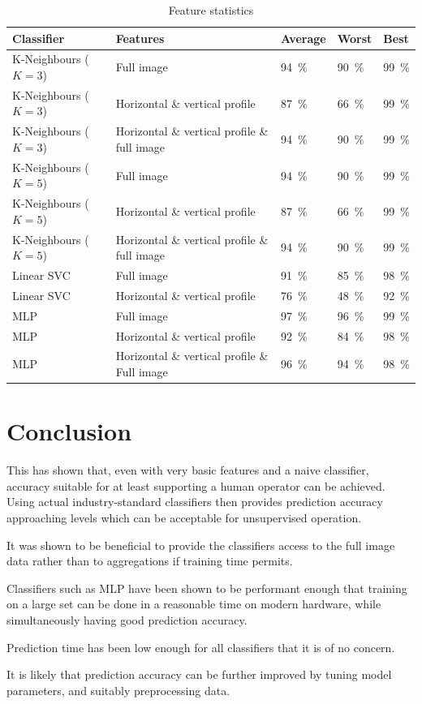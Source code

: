 \documentclass[a4paper]{scrreprt}
\begin{document}
\begin{table}
		\begin{tabular}{lllll}
				\toprule
				Classifier & Features & Average & Worst & Best \\
				\midrule
				K-Neighbours ($K = 3$) & Full image & \SI{94}{\percent} & \SI{90}{\percent} & \SI{99}{\percent} \\
				K-Neighbours ($K = 3$) & Horizontal \& vertical profile & \SI{87}{\percent} & \SI{66}{\percent} & \SI{99}{\percent} \\
				K-Neighbours ($K = 3$) & Horizontal \& vertical profile \& full image & \SI{94}{\percent} & \SI{90}{\percent} & \SI{99}{\percent} \\
				K-Neighbours ($K = 5$) & Full image & \SI{94}{\percent} & \SI{90}{\percent} & \SI{99}{\percent} \\
				K-Neighbours ($K = 5$) & Horizontal \& vertical profile & \SI{87}{\percent} & \SI{66}{\percent} & \SI{99}{\percent} \\
				K-Neighbours ($K = 5$) & Horizontal \& vertical profile \& full image & \SI{94}{\percent} & \SI{90}{\percent} & \SI{99}{\percent} \\
				Linear SVC & Full image & \SI{91}{\percent} & \SI{85}{\percent} & \SI{98}{\percent} \\
				Linear SVC & Horizontal \& vertical profile & \SI{76}{\percent} & \SI{48}{\percent} & \SI{92}{\percent} \\
				MLP & Full image & \SI{97}{\percent} & \SI{96}{\percent} & \SI{99}{\percent} \\
				MLP & Horizontal \& vertical profile & \SI{92}{\percent} & \SI{84}{\percent} & \SI{98}{\percent} \\
				MLP & Horizontal \& vertical profile \& Full image & \SI{96}{\percent} & \SI{94}{\percent} & \SI{98}{\percent} \\
				\bottomrule
		\end{tabular}
		\label{tbl:evaluation}
		\caption{Feature statistics}
\end{table}

\section{Conclusion}

This has shown that, even with very basic features and a naive classifier,
accuracy suitable for at least supporting a human operator can be achieved.
Using actual industry-standard classifiers then provides prediction accuracy
approaching levels which can be acceptable for unsupervised operation.

It was shown to be beneficial to provide the classifiers access to the full
image data rather than to aggregations if training time permits.

Classifiers such as MLP have been shown to be performant enough that training
on a large set can be done in a reasonable time on modern hardware, while
simultaneously having good prediction accuracy.

Prediction time has been low enough for all classifiers that it is of no
concern.

It is likely that prediction accuracy can be further improved by tuning model
parameters, and suitably preprocessing data.
\end{document}

